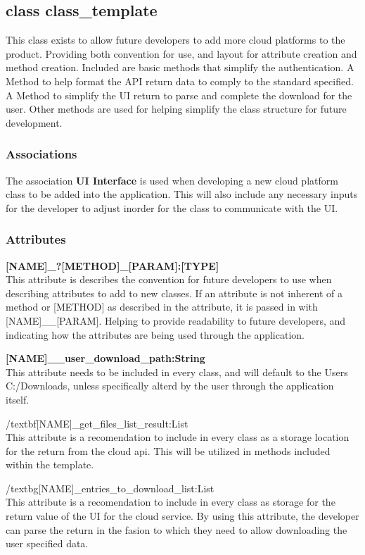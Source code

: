 \subsection{class class\_template}
This class exists to allow future developers to add more cloud platforms to the product. Providing both convention for use, and layout 
for attribute creation and method creation. Included are basic methods that simplify the authentication. A Method to help format the 
API return data to comply to the standard specified. A Method to simplify the UI return to parse and complete the download for the user.
Other methods are used for helping simplify the class structure for future development. 
​
\subsubsection{Associations}
The association \textbf{UI Interface} is used when developing a new cloud platform class to be added into the application. This will also 
include any necessary inputs for the developer to adjust inorder for the class to communicate with the UI. 
​

\subsubsection{Attributes}
\textbf{[NAME]\_?[METHOD]\_[PARAM]:[TYPE]} \\
This attribute is describes the convention for future developers to use when describing attributes to add to new classes. 
If an attribute is not inherent of a method or [METHOD] as described in the attribute, it is passed in with [NAME]\_\_[PARAM].
Helping to provide readability to future developers, and indicating how the attributes are being used through the application.

\textbf{[NAME]\_\_user\_download\_path:String} \\
This attribute needs to be included in every class, and will default to the Users C:/Downloads, unless specifically alterd by the user 
through the application itself. 

/textbf{[NAME]_get_files_list_result:List} \\
This attribute is a recomendation to include in every class as a storage location for the return from the cloud api. This will be 
utilized in methods included within the template. 

/textbg{[NAME]_entries_to_download_list:List} \\
This attribute is a recomendation to include in every class as storage for the return value of the UI for the cloud service. By using
this attribute, the developer can parse the return in the fasion to which they need to allow downloading the user specified data.

